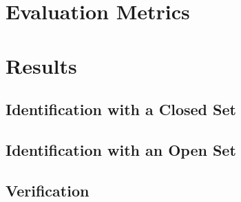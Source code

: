 \section{Evaluation Metrics}

\section{Results}

\subsection{Identification with a Closed Set}

\subsection{Identification with an Open Set}

\subsection{Verification}